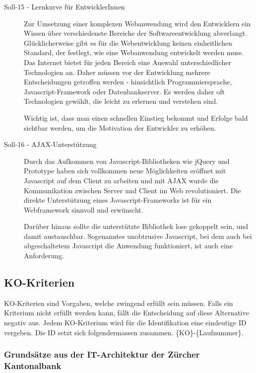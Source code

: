 \begin{description}
    \item[Soll-15 - Lernkurve für EntwicklerInnen\label{itm:Soll-15}]

    Zur Umsetzung einer komplexen Webanwendung wird den Entwicklern ein Wissen
    über verschiedenste Bereiche der Softwareentwicklung abverlangt.
    Glücklicherweise gibt es für die Webentwicklung keinen einheitlichen
    Standard, der festlegt, wie eine Webanwendung entwickelt werden muss. Das
    Internet bietet für jeden Bereich eine Auswahl unterschiedlicher
    Technologien an. Daher müssen vor der Entwicklung mehrere Entscheidungen
    getroffen werden - hinsichtlich Programmiersprache, Javascript-Framework
    oder Datenbankserver. Es werden daher oft Technologien gewählt, die leicht
    zu erlernen und verstehen sind.

    Wichtig ist, dass man einen schnellen Einstieg bekommt und Erfolge bald
    sichtbar werden, um die Motivation der Entwickler zu erhöhen.

    \item[Soll-16 - AJAX-Unterstützung\label{itm:Soll-16}]

    Durch das Aufkommen von Javascript-Bibliotheken wie jQuery und Prototype
    haben sich vollkommen neue Möglichkeiten eröffnet mit Javascript auf dem
    Client zu arbeiten und mit AJAX wurde die Kommunikation zwischen Server und
    Client im Web revolutioniert. Die direkte Unterstützung eines
    Javascript-Frameworks ist für ein Webframework sinnvoll und erwünscht.

    Darüber hinaus sollte die unterstützte Bibliothek lose gekoppelt sein, und
    damit austauschbar. Sogenanntes unobtrusive Javascript, bei dem auch bei
    abgeschaltetem Javascript die Anwendung funktioniert, ist auch eine Anforderung.
  \end{description}    
    
  \subsection{KO-Kriterien}
  
  KO-Kriterien sind Vorgaben, welche zwingend erfüllt sein müssen. Falls ein
  Kriterium nicht erfüllt werden kann, fällt die Entscheidung auf diese
  Alternative negativ aus. Jedem KO-Kriterium wird für die Identifikation eine
  eindeutige ID vergeben. Die ID setzt sich folgendermassen zusammen.
  \{KO\}-\{Laufnummer\}.
  
  \subsubsection{Grundsätze aus der IT-Architektur der Zürcher Kantonalbank}
  
